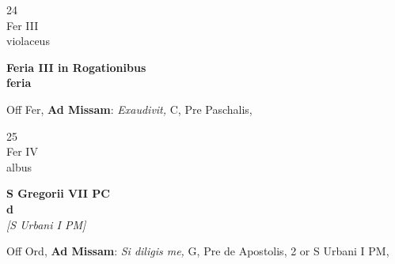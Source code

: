 \documentclass[10pt, openany]{book}
\begin{document}
        \begin{center}
            \begin{minipage}{3.5in}
                \vspace{2em}
                \begin{minipage}{0.5in}
                    {\Huge 24} \\
                    {\normalsize Fer III} \\
                    {\normalsize violaceus}
                \end{minipage}
                \begin{minipage}{3.0in}
                    \textbf{ \large Feria III in Rogationibus \\
                    \textnormal{\normalsize feria}} \\ 
                \end{minipage}
                \begin{justify}Off Fer, \textbf{Ad Missam}: \textit{Exaudivit,} C, Pre Paschalis,   
                \end{justify}
            \end{minipage}
        \end{center}
    
        \begin{center}
            \begin{minipage}{3.5in}
                \vspace{2em}
                \begin{minipage}{0.5in}
                    {\Huge 25} \\
                    {\normalsize Fer IV} \\
                    {\normalsize albus}
                \end{minipage}
                \begin{minipage}{3.0in}
                    \textbf{ \large S Gregorii VII PC \\
                    \textnormal{\normalsize d}} \\ \textit{[S Urbani I PM]} \\ 
                \end{minipage}
                \begin{justify}Off Ord, \textbf{Ad Missam}: \textit{Si diligis me,} G, Pre de Apostolis, 2 or S Urbani I PM,   
                \end{justify}
            \end{minipage}
        \end{center}
    
\end{document}
